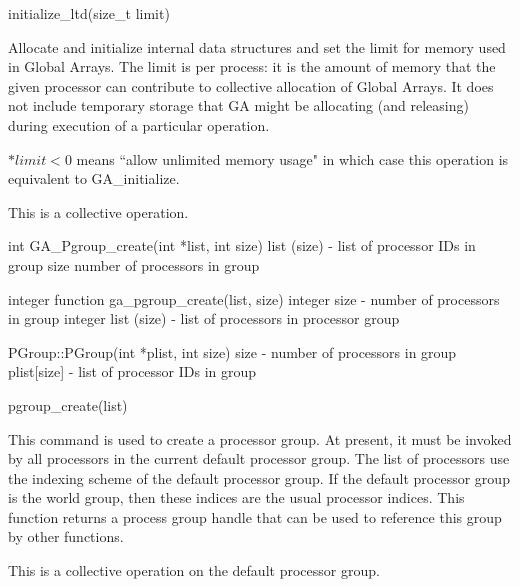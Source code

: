 \documentclass[12pt]{article}
\begin{document}
\begin{pyapi}
initialize_ltd(size_t limit)
\end{pyapi}

\begin{desc}

  Allocate and initialize internal data structures and set the limit for
  memory used in Global Arrays. The limit is per process: it is the
  amount of memory that the given processor can contribute to
  collective allocation of Global Arrays. It does not include
  temporary storage that GA might be allocating (and releasing) during
  execution of a particular operation.

  $*limit < 0$ means ``allow unlimited memory usage" in which case this
  operation is equivalent to GA_initialize.

This is a collective operation.

\end{desc}



\begin{capi}
int GA_Pgroup_create(int *list, int size)
   list (size)            - list of processor IDs in group                \access{[input]} 
   size                     number of processors in group                 \access{[input]} 
\end{capi}

\begin{fapi}
integer function ga_pgroup_create(list, size)
   integer       size             - number of processors in group         \access{[input]} 
   integer       list (size)      - list of processors in 
                                    processor group                       \access{[input]} 
\end{fapi}

\begin{cxxapi}
PGroup::PGroup(int *plist, int size)
   size                              - number of processors in group      \access{[input]}
   plist[size]                       - list of processor IDs in group     \access{[input]}
\end{cxxapi}

\begin{pyapi}
pgroup_create(list)
\end{pyapi}

\begin{desc}

  This command is used to create a processor group. At present, it
  must be invoked by all processors in the current default processor
  group. The list of processors use the indexing scheme of the default
  processor group. If the default processor group is the world group,
  then these indices are the usual processor indices. This function
  returns a process group handle that can be used to reference this
  group by other functions.

  This is a collective operation on the default processor group.

\end{desc}
\end{document}
